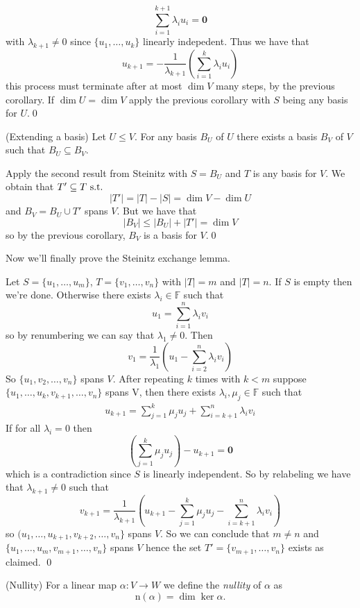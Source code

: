 \documentclass{article}
\newcommand{\F}{\mathbb{F}}
\newcommand{\n}{\mathrm{n}}
\begin{document}
\[
	\sum_{i=1}^{k+1}\lambda_i u_i=\mathbf 0
\]
with $ \lambda_{k+1}\ne 0 $ since $ \{u_1,\dots, u_k\} $ linearly indepedent. Thus we have that
\[
	u_{k+1}=-\frac 1{\lambda_{k+1}}\left(\sum_{i=1}^k\lambda_iu_i\right)
\]
this process must terminate after at most $ \dim V $ many steps, by the previous corollary. If $ \dim U=\dim V $ apply the previous corollary with $ S $ being any basis for $ U $.\qed
\begin{proposition}
	(Extending a basis) Let $ U\le V $. For any basis $ B_U $ of $ U $ there exists a basis $ B_V $ of $ V $ such that $ B_U\subseteq B_V $.
\end{proposition}
\pf Apply the second result from Steinitz with $ S=B_U $ and $ T $ is any basis for $ V $. We obtain that $ T'\subseteq T\text{ s.t.\ } $ 
\[
  |T'|=|T|-|S|=\dim V-\dim U
\]
and $ B_V=B_U\cup T' $ spans $ V $. But we have that
\[
  |B_V|\le |B_U|+|T'|=\dim V
\]
so by the previous corollary, $ B_V $ is a basis for $ V $.\qed\par
Now we'll finally prove the Steinitz exchange lemma.\par
\pf Let $ S=\{u_1,\dots, u_m\} $, $ T=\{v_1,\dots, v_n\} $ with $ |T|=m $ and $ |T|=n $. If $ S $ is empty then we're done. Otherwise there exists $ \lambda_i\in \F $ such that 
\[
	u_1=\sum_{i=1}^n\lambda_iv_i
\]
so by renumbering we can say that $ \lambda_1\ne 0 $. Then
\[
	v_1=\frac 1{\lambda_1}\left(u_1-\sum_{i=2}^n\lambda_iv_i\right)
\]
So $ \{u_1,v_2,\dots, v_n\} $ spans $ V $. After repeating $ k $ times with $ k<m $ suppose $ \{u_1,\dots, u_k,v_{k+1},\dots, v_n\} $ spans V, then there exists $ \lambda_i,\mu_j\in\F $ such that
\begin{align*}
	u_{k+1}=\sum_{j=1}^k\mu_ju_j+\sum_{i=k+1}^n\lambda_iv_i
\end{align*}
If for all $ \lambda_i= 0 $ then
\[
	\left(\sum_{j=1}^k\mu_ju_j\right) -u_{k+1}=\mathbf 0
\]
which is a contradiction since $ S $ is linearly independent. So by relabeling we have that $ \lambda_{k+1}\ne 0 $ such that 
\[
	v_{k+1}=\frac 1{\lambda_{k+1}}\left(u_{k+1}-\sum_{j=1}^k\mu_ju_j-\sum_{i=k+1}^n\lambda_iv_i\right)
\]
so $ (u_1,\dots, u_{k+1},v_{k+2},\dots, v_n\}$ spans $ V $. So we can conclude that $ m\ne n $ and $ \{u_1,\dots, u_m,v_{m+1},\dots, v_n\} $ spans $ V $ hence the set $ T'=\{v_{m+1},\dots, v_n\} $ exists as claimed. \qed
\begin{definition}
	(Nullity) For a linear map $ \alpha:V\to W $ we define the \textit{nullity} of $ \alpha $ as
	\[
	  \n(\alpha)=\dim\ker\alpha.
	\]
\end{definition}
\end{document}
